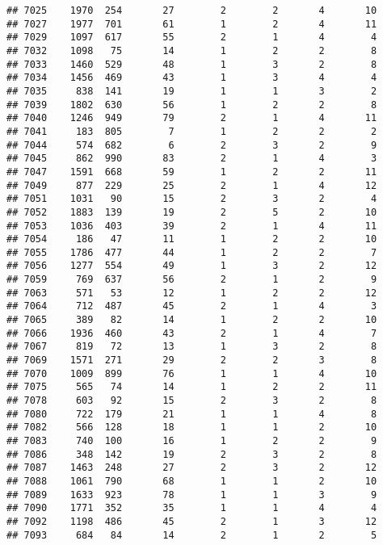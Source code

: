\documentclass[]{article}
\begin{document}
\begin{verbatim}
## 7025    1970  254       27        2        2       4       10
## 7027    1977  701       61        1        2       4       11
## 7029    1097  617       55        2        1       4        4
## 7032    1098   75       14        1        2       2        8
## 7033    1460  529       48        1        3       2        8
## 7034    1456  469       43        1        3       4        4
## 7035     838  141       19        1        1       3        2
## 7039    1802  630       56        1        2       2        8
## 7040    1246  949       79        2        1       4       11
## 7041     183  805        7        1        2       2        2
## 7044     574  682        6        2        3       2        9
## 7045     862  990       83        2        1       4        3
## 7047    1591  668       59        1        2       2       11
## 7049     877  229       25        2        1       4       12
## 7051    1031   90       15        2        3       2        4
## 7052    1883  139       19        2        5       2       10
## 7053    1036  403       39        2        1       4       11
## 7054     186   47       11        1        2       2       10
## 7055    1786  477       44        1        2       2        7
## 7056    1277  554       49        1        3       2       12
## 7059     769  637       56        2        1       2        9
## 7063     571   53       12        1        2       2       12
## 7064     712  487       45        2        1       4        3
## 7065     389   82       14        1        2       2       10
## 7066    1936  460       43        2        1       4        7
## 7067     819   72       13        1        3       2        8
## 7069    1571  271       29        2        2       3        8
## 7070    1009  899       76        1        1       4       10
## 7075     565   74       14        1        2       2       11
## 7078     603   92       15        2        3       2        8
## 7080     722  179       21        1        1       4        8
## 7082     566  128       18        1        1       2       10
## 7083     740  100       16        1        2       2        9
## 7086     348  142       19        2        3       2        8
## 7087    1463  248       27        2        3       2       12
## 7088    1061  790       68        1        1       2       10
## 7089    1633  923       78        1        1       3        9
## 7090    1771  352       35        1        1       4        4
## 7092    1198  486       45        2        1       3       12
## 7093     684   84       14        2        1       2        5

\end{verbatim}
\end{document}
